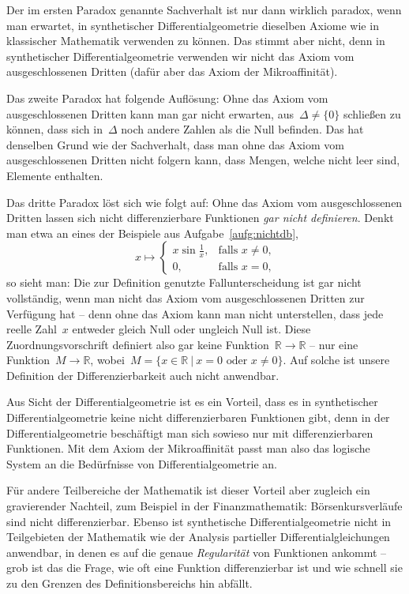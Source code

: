 \documentclass[twoside]{../zirkelblatt}
\newcommand{\RR}{\mathbb{R}}
\theoremstyle{definition}
\theoremstyle{plain}
\theoremstyle{remark}
\begin{document}
Der im ersten Paradox genannte Sachverhalt ist nur dann wirklich paradox, wenn
man erwartet, in synthetischer Differentialgeometrie dieselben Axiome wie in
klassischer Mathematik verwenden zu können. Das stimmt aber nicht, denn in
synthetischer Differentialgeometrie verwenden wir nicht das Axiom vom
ausgeschlossenen Dritten (dafür aber das Axiom der Mikroaffinität).

Das zweite Paradox hat folgende Auflösung: Ohne das Axiom vom ausgeschlossenen
Dritten kann man gar nicht erwarten, aus~$\Delta \neq \{0\}$ schließen zu
können, dass sich in~$\Delta$ noch andere Zahlen als die Null befinden.
Das hat denselben Grund wie der Sachverhalt, dass man ohne das Axiom vom
ausgeschlossenen Dritten nicht folgern kann, dass Mengen, welche nicht leer
sind, Elemente enthalten.

Das dritte Paradox löst sich wie folgt auf: Ohne das Axiom vom ausgeschlossenen
Dritten lassen sich nicht differenzierbare Funktionen \emph{gar nicht definieren}.
Denkt man etwa an eines der Beispiele aus Aufgabe~\ref{aufg:nichtdb},
\[ x \longmapsto \begin{cases}x \sin\frac{1}{x}, & \text{falls $x \neq 0$,} \\
0, & \text{falls $x = 0$,}\end{cases} \]
so sieht man: Die zur Definition genutzte Fallunterscheidung ist gar nicht
vollständig, wenn man nicht das Axiom vom ausgeschlossenen Dritten zur
Verfügung hat -- denn ohne das Axiom kann man nicht unterstellen, dass jede reelle
Zahl~$x$ entweder gleich Null oder ungleich Null ist. Diese
Zuordnungsvorschrift definiert also gar keine Funktion~$\RR \to \RR$ -- nur
eine Funktion~$M \to \RR$, wobei~$M = \{ x \in \RR \ |\ \text{$x = 0$ oder $x \neq 0$} \}$.
Auf solche ist unsere Definition der Differenzierbarkeit auch nicht anwendbar.

Aus Sicht der Differentialgeometrie ist es ein Vorteil, dass es in
synthetischer Differentialgeometrie keine nicht differenzierbaren Funktionen
gibt, denn in der Differentialgeometrie beschäftigt man sich sowieso nur mit
differenzierbaren Funktionen. Mit dem Axiom der Mikroaffinität passt man also
das logische System an die Bedürfnisse von Differentialgeometrie an.

Für andere Teilbereiche der Mathematik ist dieser Vorteil aber zugleich ein
gravierender Nachteil, zum Beispiel in der Finanzmathematik: Börsenkursverläufe
sind nicht differenzierbar. Ebenso ist synthetische Differentialgeometrie nicht
in Teilgebieten der Mathematik wie der Analysis partieller
Differentialgleichungen anwendbar, in denen es auf die genaue
\emph{Regularität} von Funktionen ankommt -- grob ist das die Frage, wie oft eine
Funktion differenzierbar ist und wie schnell sie zu den Grenzen des
Definitionsbereichs hin abfällt.
\end{document}
